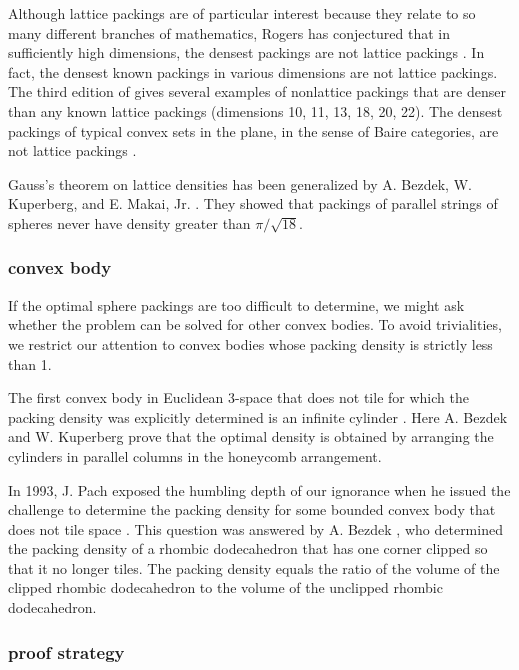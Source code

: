 Although lattice packings are of particular interest because they
relate to so many different branches of mathematics, Rogers has
conjectured that in sufficiently high dimensions, the densest
packings are not lattice packings \cite{Rog64}.   In fact, the
densest known packings in various dimensions are not lattice
packings.  The third edition of \cite{CS} gives several examples
of nonlattice packings that are denser than any known lattice
packings (dimensions 10, 11, 13, 18, 20, 22). The densest packings
of typical convex sets in the plane, in the sense of Baire
categories, are not lattice packings \cite{Fej95}.

Gauss's theorem on lattice densities has been generalized by
A. Bezdek, W. Kuperberg, and E. Makai, Jr. \cite{BKM91}.
They showed that packings of parallel
strings of spheres never have density greater than $\pi/\sqrt{18}$.

\subsubsection{convex body}

If the optimal sphere packings are too difficult to determine,
we might ask whether
the problem can be solved for other convex bodies.
To avoid trivialities, we restrict our attention to convex bodies
whose packing density is strictly less than 1.

  The first convex body in Euclidean 3-space that does not tile
for which the packing density was explicitly determined is
an infinite cylinder \cite{Bez90}.
Here A. Bezdek and W. Kuperberg prove
that the
optimal density is obtained by arranging the cylinders in
parallel columns in the honeycomb arrangement.

In 1993, J. Pach exposed the humbling depth of our ignorance when he issued
the challenge to determine the packing density for some bounded convex
body that does not tile space \cite{MP93}.
 This question was answered by
A. Bezdek \cite{Bez94}, who determined the packing density of a rhombic
dodecahedron that has one corner clipped so that it no longer tiles.
The packing density equals the ratio of the
volume of the clipped
rhombic dodecahedron to the volume of the unclipped rhombic dodecahedron.

\subsubsection{proof strategy}

